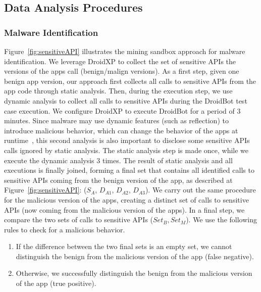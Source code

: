 
\subsection{Data Analysis Procedures} \label{sec:dataAnalysisProc}

\subsubsection{Malware Identification} \label{sec:malwaresetup}
Figure~\ref{fig:sensitiveAPI} illustrates the mining sandbox approach for
malware identification. We leverage DroidXP to collect the set of sensitive APIs the versions of the apps call (benign/malign versions). As a first step, given one benign app version,
our approach first collects all calls to sensitive APIs from the app code through static analysis. Then, during the execution step,
we use dynamic analysis to collect all calls to sensitive APIs during the DroidBot test case execution. We configure DroidXP to execute DroidBot for a
period of $3$ minutes. Since malware may use dynamic features (such as reflection) to introduce malicious behavior, which can change the behavior of the apps at runtime~\cite{DBLP:journals/spe/ZhangLTX18,DBLP:journals/tosem/LiTX19}, this second analysis is also important to disclose some sensitive APIs calls ignored by static analysis.
The static analysis step is made once, while we execute the dynamic analysis $3$ times. The result of static analysis and all executions is finally joined,
forming a final set that contains all identified calls to sensitive APIs coming from the benign version of the app, as described at Figure~\ref{fig:sensitiveAPI}: ($S_{A}$, $D_{A1}$, $D_{A2}$, $D_{A3}$). We carry out the same procedure for the malicious version of the apps,
creating a distinct set of calls to sensitive APIs (now coming from the malicious version of the apps). In
a final step, we compare the two sets of calls to sensitive APIs ($Set_B, Set_M$). We use the following rules to
check for a malicious behavior. 

\begin{enumerate}
    \item If the difference between the two final sets is an empty set, we cannot distinguish the benign from the malicious version of the app (false negative).
    \item Otherwise, we successfully distinguish the benign from the malicious version of the app (true positive). 
\end{enumerate}

